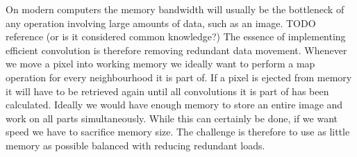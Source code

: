 On modern computers the memory bandwidth will usually be the bottleneck of any operation involving large amounts of data, such as an image. TODO reference (or is it considered common knowledge?)
The essence of implementing efficient convolution is therefore removing redundant data movement.
Whenever we move a pixel into working memory we ideally want to perform a map operation for every neighbourhood it is part of.
If a pixel is ejected from memory it will have to be retrieved again until all convolutions it is part of has been calculated.
Ideally we would have enough memory to store an entire image and work on all parts simultaneously. While this can certainly be done, if we want speed we have to sacrifice memory size.
The challenge is therefore to use as little memory as possible balanced with reducing redundant loads.\\

